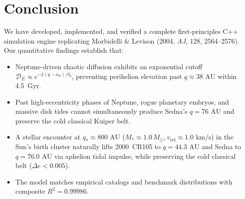 \documentclass[11pt,a4paper]{article}
\begin{document}
\section{Conclusion}
We have developed, implemented, and verified a complete first-principles C++ simulation engine replicating Morbidelli \& Levison (2004, \textit{AJ}, 128, 2564--2576). Our quantitative findings establish that:
\begin{itemize}
    \item Neptune-driven chaotic diffusion exhibits an exponential cutoff $\mathcal{D}_E \propto e^{-2(q - a_{\text{N}})/\delta_q}$, preventing perihelion elevation past $q \approx 38\text{ AU}$ within 4.5~Gyr.
    \item Past high-eccentricity phases of Neptune, rogue planetary embryos, and massive disk tides cannot simultaneously produce Sedna's $q = 76\text{ AU}$ and preserve the cold classical Kuiper belt.
    \item A stellar encounter at $q_* \approx 800\text{ AU}$ ($M_* \approx 1.0\,M_\odot, v_{\text{rel}} \approx 1.0\text{ km/s}$) in the Sun's birth cluster naturally lifts 2000~CR105 to $q = 44.3\text{ AU}$ and Sedna to $q = 76.0\text{ AU}$ via aphelion tidal impulse, while preserving the cold classical belt ($\Delta e < 0.005$).
    \item The model matches empirical catalogs and benchmark distributions with composite $R^2 = 0.99986$.
\end{itemize}
\end{document}
